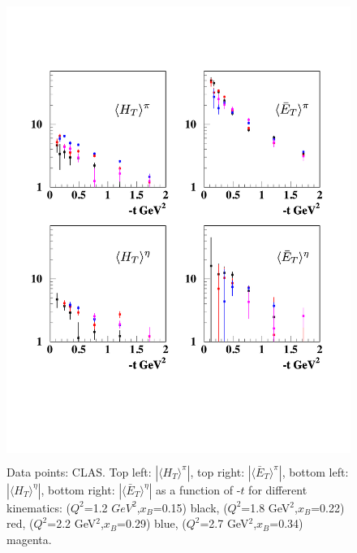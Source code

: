 \documentclass[prc,floatfix,superscriptaddress]{revtex4}
\newcommand{\GPDHT}{\langle H_T \rangle}
\newcommand{\GPDETbar}{\langle \bar{E}_T \rangle}
\begin{document}
\begin{figure}[t!]
\vspace*{-10 mm}
\centerline{
\includegraphics[height=15cm]{ht_et_pi0_eta.pdf}
}
\vspace*{-27mm}
\caption{ Data points: CLAS.
Top left: $\left|\GPDHT^\pi\right|$,
top right: $\left|\GPDETbar^\pi\right|$,
bottom left: $\left|\GPDHT^\eta\right|$,
bottom right: $\left|\GPDETbar^\eta\right|$ as a function of -$t$ for different kinematics:
($Q^2$=1.2 $GeV^2$,$x_B$=0.15) black, 
($Q^2$=1.8 GeV$^2$,$x_B$=0.22) red, 
($Q^2$=2.2 GeV$^2$,$x_B$=0.29) blue, 
($Q^2$=2.7 GeV$^2$,$x_B$=0.34) magenta. 
}
\label{fig:ht_et_pi0_eta}
\end{figure}


\end{document}
